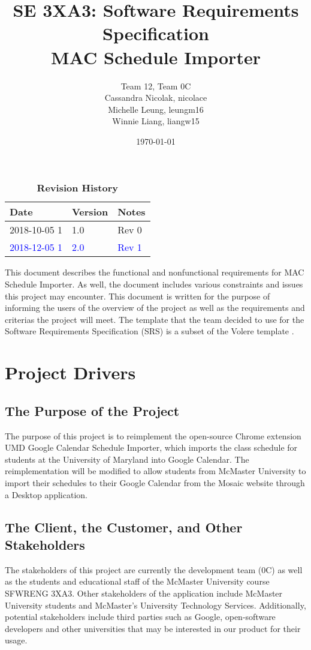 \documentclass[12pt, titlepage]{article}
\title{SE 3XA3: Software Requirements Specification\\MAC Schedule Importer}
\author{Team 12, Team 0C
		\\ Cassandra Nicolak, nicolace
		\\ Michelle Leung, leungm16
		\\ Winnie Liang, liangw15
}
\date{\today}
\begin{document}
\maketitle

\tableofcontents
\listoftables
\listoffigures


\begin{table}[bp]
\caption{\bf Revision History}
\begin{tabularx}{\textwidth}{p{3cm}p{2cm}X}
\toprule {\bf Date} & {\bf Version} & {\bf Notes}\\
\midrule
2018-10-05 1 & 1.0 & Rev 0\\
\textcolor{blue}{2018-12-05 1}
 & \textcolor{blue}{2.0} & \textcolor{blue}{Rev 1}\\
\bottomrule
\end{tabularx}
\end{table}

\newpage

\color{blue}
This document describes the functional and nonfunctional requirements for MAC Schedule Importer. As well, the document includes various constraints and issues this project may encounter. This document is written for the purpose of informing the users of the overview of the project as well as the requirements and criterias the project will meet. The template that the team decided to use for the Software
Requirements Specification (SRS) is a subset of the Volere
template  \cite{volere}.
\color{black}
\section{Project Drivers}

\subsection{The Purpose of the Project}
\hspace{5mm}The purpose of this project is to reimplement the open-source Chrome extension UMD Google Calendar Schedule Importer, which imports the class schedule for students at the University of Maryland into Google Calendar.
\color{blue} The reimplementation will be modified to allow students from McMaster University to import their schedules to their Google Calendar from the Mosaic website through a Desktop application. 
\color{black}

\subsection{The Client, the Customer, and Other Stakeholders}
\hspace{5mm}The stakeholders of this project are currently the development team (0C) as well as the students and educational staff of the McMaster University course SFWRENG 3XA3. Other stakeholders of the application include McMaster University students and McMaster's University Technology Services.  Additionally, potential stakeholders include third parties such as Google, open-software developers and other universities that may be interested in our product for their usage.\\
\end{document}

